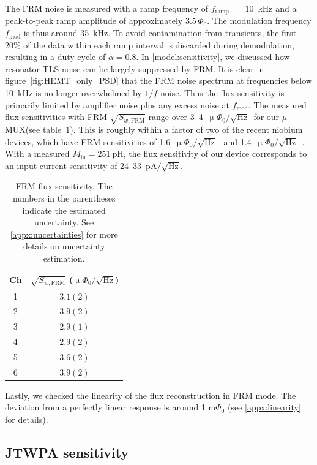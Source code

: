 \documentclass[10pt]{iopart}
\newcommand{\uMUX}{$\mu$MUX\xspace}
\newcommand{\uPhirtHz}{$\upmu \Phi_0/\sqrt{\text{Hz}}$\xspace}
\begin{document}
The FRM noise is measured with a ramp frequency of $f_{\mathrm{ramp}} = $~\qty{10}{\kHz} and a peak-to-peak ramp amplitude of approximately $3.5\,\Phi_0$. The modulation frequency $f_{\text{mod}}$ is thus around \qty{35}{kHz}. To avoid contamination from transients, the first $20\%$ of the data within each ramp interval is discarded during demodulation, resulting in a duty cycle of \mbox{$\alpha = 0.8$}. In \cref{model:sensitivity}, we discussed how resonator TLS noise can be largely suppressed by FRM. It is clear in figure~\ref{fig:HEMT_only_PSD} that the FRM noise spectrum at frequencies below \qty{10}{\kHz} is no longer overwhelmed by $1/f$ noise. Thus the flux sensitivity is primarily limited by amplifier noise plus any excess noise at $f_{\text{mod}}$. The measured flux sensitivities with FRM $\sqrt{S_{w, \text{FRM}}}$ range over 3--4~\uPhirtHz~for our \uMUX (see table~\ref{tab:FRM_noise}). This is roughly within a factor of two of the recent niobium devices, which have FRM sensitivities of 1.6~\uPhirtHz~\cite{malnou_improved_2023} and 1.4~\uPhirtHz~\cite{neidig_full-scale_2025}. With a measured $M_{\mathrm{in}} = 251~\mathrm{pH}$, the flux sensitivity of our device corresponds to an input current sensitivity of 24--33~$\mathrm{pA}/\sqrt{\mathrm{Hz}}$.

\begin{table}[htb]
    \centering
    \begin{tabular}{c c}
    \hline
         \small{Ch} & \small{$\sqrt{S_{w, \text{FRM}}}$ (\uPhirtHz)}\\
    \hline
    1 & $3.1 (2)$\\
    2 & $3.9 (2)$\\
    3 & $2.9 (1)$\\
    4 & $2.9 (2)$\\
    5 & $3.6 (2)$\\
    6 & $3.9 (2)$\\
    \hline
    \end{tabular}
    \caption{FRM flux sensitivity. The numbers in the parentheses indicate the estimated uncertainty. See \ref{appx:uncertainties} for more details on uncertainty estimation.}
    \label{tab:FRM_noise}
\end{table}

Lastly, we checked the linearity of the flux reconstruction in FRM mode. The deviation from a perfectly linear response is around 1 $\mathrm{m}\Phi_0$ (see \ref{appx:linearity} for details).


\subsection{JTWPA sensitivity}
\label{results:TWPA}
\end{document}
